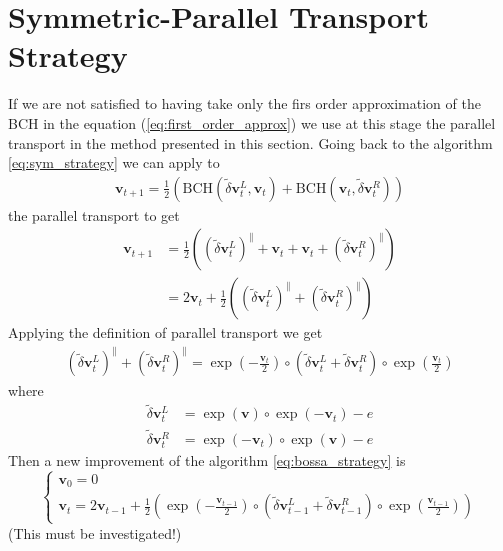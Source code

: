 \section{Symmetric-Parallel Transport Strategy}
If we are not satisfied to having take only the firs order approximation of the BCH in the equation (\ref{eq:first_order_approx}) we use at this stage the parallel transport in the method presented in this section.
Going back to the algorithm \ref{eq:sym_strategy} we can apply to
\begin{align*}
\mathbf{v}_{t+1} = \frac{1}{2}(\text{BCH}(\tilde{\delta} \mathbf{v}^{L}_{t}, \mathbf{v}_{t}) + \text{BCH}(\mathbf{v}_{t},\tilde{\delta} \mathbf{v}^{R}_{t}))
\end{align*}
the parallel transport to get
\begin{align*}
\mathbf{v}_{t+1} &= \frac{1}{2}((\tilde{\delta} \mathbf{v}^{L}_{t})^{\parallel} + \mathbf{v}_{t} + \mathbf{v}_{t} + (\tilde{\delta} \mathbf{v}^{R}_{t})^{\parallel}) \\
&= 2\mathbf{v}_{t} + \frac{1}{2}((\tilde{\delta} \mathbf{v}^{L}_{t})^{\parallel} + (\tilde{\delta} \mathbf{v}^{R}_{t})^{\parallel})
\end{align*}
Applying the definition of parallel transport we get
\begin{align*}
(\tilde{\delta} \mathbf{v}^{L}_{t})^{\parallel} + (\tilde{\delta} \mathbf{v}^{R}_{t})^{\parallel} 
= 
\exp(-\frac{\mathbf{v}_{t}}{2}) \circ (\tilde{\delta} \mathbf{v}^{L}_{t} +\tilde{\delta} \mathbf{v}^{R}_{t} )\circ \exp(\frac{\mathbf{v}_{t}}{2})
\end{align*}
where 
\begin{align*}
\tilde{\delta} \mathbf{v}^{L}_{t} &=  \exp(\mathbf{v})\circ \exp(-\mathbf{v}_{t}) - e \\
\tilde{\delta} \mathbf{v}^{R}_{t} &=  \exp(-\mathbf{v}_{t})\circ \exp(\mathbf{v}) - e
\end{align*}
Then a new improvement of the algorithm \ref{eq:bossa_strategy}  is
\begin{equation}\label{eq:sym_parallel_strategy}
\begin{cases}
\mathbf{v}_0 = 0 \\
\mathbf{v}_{t} 
=  
2\mathbf{v}_{t-1} + \frac{1}{2}(\exp(-\frac{\mathbf{v}_{t-1}}{2}) 
\circ 
(\tilde{\delta} \mathbf{v}^{L}_{t-1} +\tilde{\delta} \mathbf{v}^{R}_{t-1} )\circ \exp(\frac{\mathbf{v}_{t-1}}{2}))
\end{cases}
\end{equation}
(This must be investigated!)